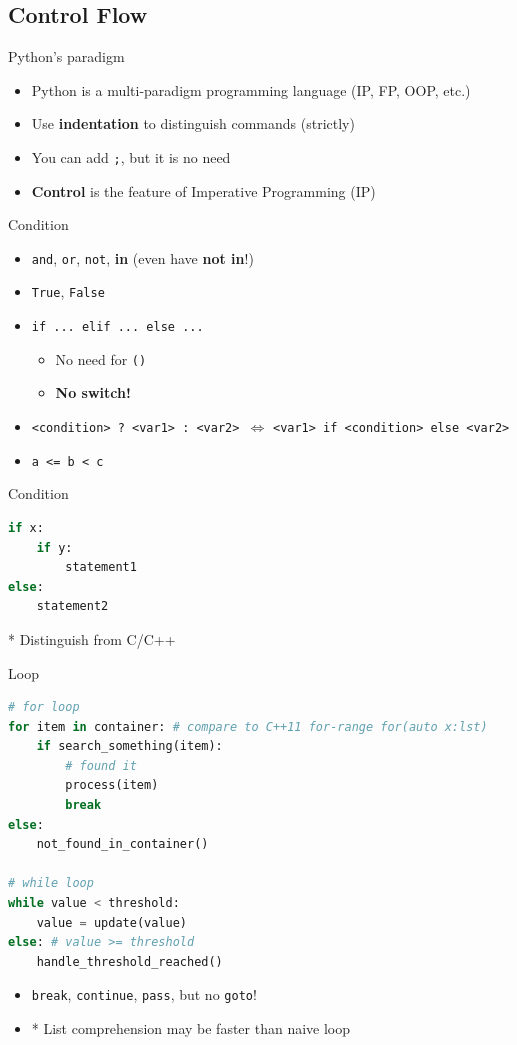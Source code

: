 \documentclass{../TexTemplate/myslide}
\begin{document}
\subsection{Control Flow}
\begin{frame}[fragile]{Python's paradigm}
\begin{itemize}
	\item Python is a multi-paradigm programming language (IP, FP, OOP, etc.)
	\item Use \textbf{indentation} to distinguish commands (strictly)
	\item You can add \verb';', but it is no need
	\item \textbf{Control} is the feature of Imperative Programming (IP)
\end{itemize}
\end{frame}

\begin{frame}[fragile]{Condition}
\begin{itemize}
	\item \verb'and', \verb'or', \verb'not', \textbf{in} (even have \textbf{not in}!)
	\item \verb'True', \verb'False'
	\item \verb'if ... elif ... else ...'
	\begin{itemize}
		\item No need for \verb'()'
		\item \textbf{No switch!}
	\end{itemize}
	\item \verb'<condition> ? <var1> : <var2> '$\iff$ \verb'<var1> if <condition> else <var2>'
	\item \verb'a <= b < c'
\end{itemize}
\end{frame}

\begin{frame}[fragile]{Condition}
\begin{lstlisting}[language=python]
if x:
    if y:
        statement1
else:
    statement2
\end{lstlisting}
* Distinguish from C/C++
\end{frame}

\begin{frame}[fragile]{Loop}
\begin{lstlisting}[language=python]
# for loop
for item in container: # compare to C++11 for-range for(auto x:lst)
    if search_something(item):
        # found it
        process(item)
        break
else:
    not_found_in_container()

# while loop
while value < threshold:
    value = update(value)
else: # value >= threshold
    handle_threshold_reached()
\end{lstlisting}
\begin{itemize}
\item \verb'break', \verb'continue', \verb'pass', but no \verb'goto'!
\item * List comprehension may be faster than naive loop
\end{itemize}
\end{frame}
\end{document}
